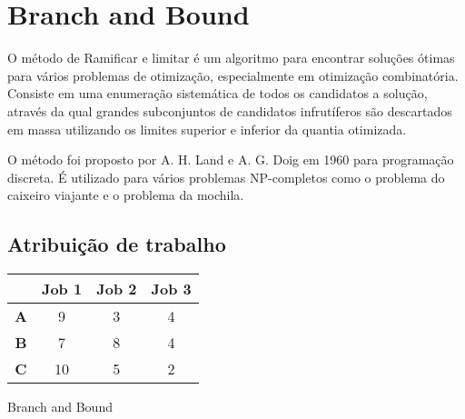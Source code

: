 \section{Branch and Bound} \label{sec:branch-and-bound}

O método de Ramificar e limitar é um algoritmo para 
encontrar soluções ótimas para vários problemas de otimização, especialmente em 
otimização combinatória. Consiste em uma enumeração sistemática de todos os candidatos
a solução, através da qual grandes subconjuntos de candidatos infrutíferos são 
descartados em massa utilizando os limites superior e inferior da quantia otimizada.

O método foi proposto por A. H. Land e A. G. Doig em 1960 para programação discreta.
É utilizado para vários problemas NP-completos como o problema do caixeiro viajante
e o problema da mochila. 

\subsection{Atribuição de trabalho}


\begin{table}[ht]
    \centering 
    \begin{tabular}{|c | c | c | c |} 
        \hline
         & \textbf{Job 1} & \textbf{Job 2} & \textbf{Job 3} \\ 
        \hline
        \textbf{A} & 9 & 3 & 4 \\ 
        \hline
        \textbf{B} & 7 & 8 & 4 \\
        \hline
        \textbf{C} & 10 & 5 & 2 \\
        \hline
   \end{tabular}
\end{table}

\begin{algorithm}
    \caption{Branch and Bound}
    \begin{algorithmic}[1]
    \EndIf
    \EndFor
    \EndProcedure
    \EndIf
    \EndFor
    \EndProcedure
    \end{algorithmic}
  \end{algorithm}

  \newpage
